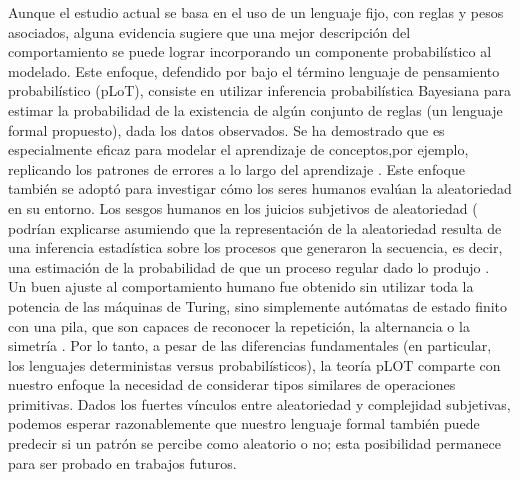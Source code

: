 Aunque el estudio actual se basa en el uso de un lenguaje fijo, con reglas y pesos asociados, alguna evidencia sugiere que una mejor descripción del comportamiento se puede lograr incorporando un componente probabilístico al modelado. Este enfoque, defendido por \cite{piantadosi2016four} bajo el término lenguaje de pensamiento probabilístico (pLoT), consiste en utilizar inferencia probabilística Bayesiana para estimar la probabilidad de la existencia de algún conjunto de reglas (un lenguaje formal propuesto), dada los datos observados. Se ha demostrado que es especialmente eficaz para modelar el aprendizaje de conceptos,por ejemplo, replicando los patrones de errores a lo largo del aprendizaje \cite{goodman2008rational,piantadosi2012bootstrapping,piantadosi2016logical}. Este enfoque también se adoptó para investigar cómo los seres humanos evalúan la aleatoriedad en su entorno. Los sesgos humanos en los juicios subjetivos de aleatoriedad (\cite{f114,f115} podrían explicarse asumiendo que la representación de la aleatoriedad resulta de una inferencia estadística sobre los procesos que generaron la secuencia, es decir, una estimación de la probabilidad de que un proceso regular dado lo produjo \cite{f21}. Un buen ajuste al comportamiento humano fue obtenido sin utilizar toda la potencia de las máquinas de Turing, sino simplemente autómatas de estado finito con una pila, que son capaces de reconocer la repetición, la alternancia o la simetría \cite{f18,f117} . Por lo tanto, a pesar de las diferencias fundamentales (en particular, los lenguajes deterministas versus probabilísticos), la teoría pLOT comparte con nuestro enfoque la necesidad de considerar tipos similares de operaciones primitivas. Dados los fuertes vínculos entre aleatoriedad y complejidad subjetivas, podemos esperar razonablemente que nuestro lenguaje formal también puede predecir si un patrón se percibe como aleatorio o no; esta posibilidad permanece para ser probado en trabajos futuros.

